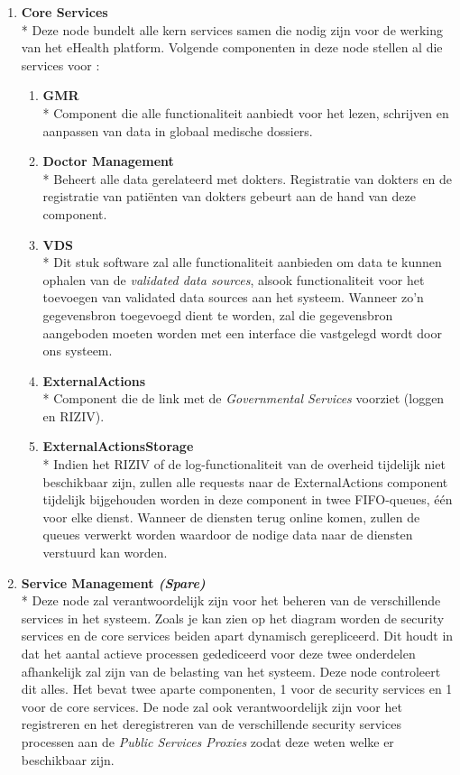 \documentclass[a4paper,10pt]{article}
\begin{document}
\begin{enumerate}
\item \textbf{Core Services}\\*
Deze node bundelt alle kern services samen die nodig zijn voor de werking van het eHealth platform. Volgende componenten in deze node stellen al die services voor : 
\begin{enumerate}
 \item \textbf{GMR}\\*
Component die alle functionaliteit aanbiedt voor het lezen, schrijven en aanpassen van data in globaal medische dossiers.
\item \textbf{Doctor Management}\\*
Beheert alle data gerelateerd met dokters. Registratie van dokters en de registratie van patiënten van dokters gebeurt aan de hand van deze component.
\item \textbf{VDS}\\*
Dit stuk software zal alle functionaliteit aanbieden om data te kunnen ophalen van de \textit{validated data sources}, alsook functionaliteit voor het toevoegen van validated data sources aan het systeem. Wanneer zo'n gegevensbron toegevoegd dient te worden, zal die gegevensbron aangeboden moeten worden met een interface die vastgelegd wordt door ons systeem. 
\item \textbf{ExternalActions}\\*
Component die de link met de \textit{Governmental Services} voorziet (loggen en RIZIV).
\item \textbf{ExternalActionsStorage}\\*
Indien het RIZIV of de log-functionaliteit van de overheid tijdelijk niet beschikbaar zijn, zullen alle requests naar de ExternalActions component tijdelijk bijgehouden worden in deze component in twee FIFO-queues, één voor elke dienst. Wanneer de diensten terug online komen, zullen de queues verwerkt worden waardoor de nodige data naar de diensten verstuurd kan worden.
\end{enumerate}

\item \textbf{Service Management \textit{(Spare)}}\\*
Deze node zal verantwoordelijk zijn voor het beheren van de verschillende services in het systeem. Zoals je kan zien op het diagram worden de security services en de core services beiden apart dynamisch gerepliceerd. Dit houdt in dat het aantal actieve processen gedediceerd voor deze twee onderdelen afhankelijk zal zijn van de belasting van het systeem. Deze node controleert dit alles. Het bevat twee aparte componenten, 1 voor de security services en 1 voor de core services. De node zal ook verantwoordelijk zijn voor het registreren en het deregistreren van de verschillende security services processen aan de \textit{Public Services Proxies} zodat deze weten welke er beschikbaar zijn.

\end{enumerate}
\end{document}
